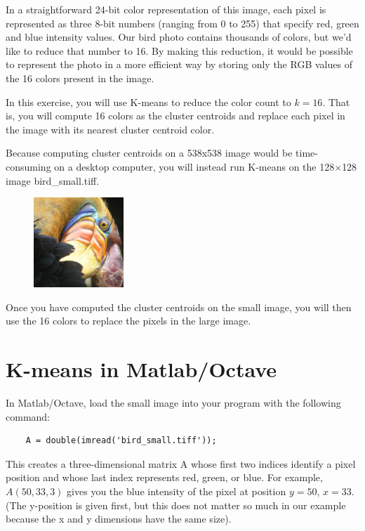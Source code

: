 \documentclass[10pt,a4paper]{article}
\begin{document}
  In a straightforward 24-bit color representation of this image, each pixel is represented as three 8-bit numbers (ranging from 0 to 255) that specify red, green and blue intensity values. Our bird photo contains thousands of colors, but we'd like to reduce that number to 16. By making this reduction, it would be possible to represent the photo in a more efficient way by storing only the RGB values of the 16 colors present in the image.

  In this exercise, you will use K-means to reduce the color count to $k = 16$. That is, you will compute 16 colors as the cluster centroids and replace each pixel in the image with its nearest cluster centroid color.

  Because computing cluster centroids on a 538x538 image would be time-consuming on a desktop computer, you will instead run K-means on the 128$\times$128 image \textsf{bird\_small.tiff}.
  \begin{figure}[htb!]
    \centering
      \includegraphics[width=.3\columnwidth]{bird_small}
  \end{figure}
  Once you have computed the cluster centroids on the small image, you will then use the 16 colors to replace the pixels in the large image.




\section{K-means in Matlab/Octave}
%
  In Matlab/Octave, load the small image into your program with the following command:
  \begin{lstlisting}
    A = double(imread('bird_small.tiff'));
  \end{lstlisting}

  This creates a three-dimensional matrix A whose first two indices identify a pixel position and whose last index represents red, green, or blue. For example, $A(50, 33, 3)$ gives you the blue intensity of the pixel at position $y = 50$, $x = 33$. (The y-position is given first, but this does not matter so much in our example because the x and y dimensions have the same size).
\end{document}
